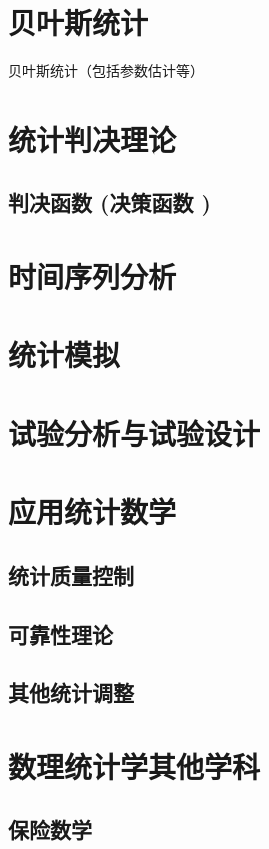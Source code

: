 \documentclass[UTF8]{../09-Mathematics}
\begin{document}
\chapter{贝叶斯统计}
贝叶斯统计（包括参数估计等）



\chapter{统计判决理论}
    \section{判决函数 (决策函数 )}


\chapter{时间序列分析}




\chapter{统计模拟}


\chapter{试验分析与试验设计}


\chapter{应用统计数学}
    \section{统计质量控制}
    \section{可靠性理论}
    \section{其他统计调整}




\chapter{数理统计学其他学科}
    \section{保险数学}
\end{document}
